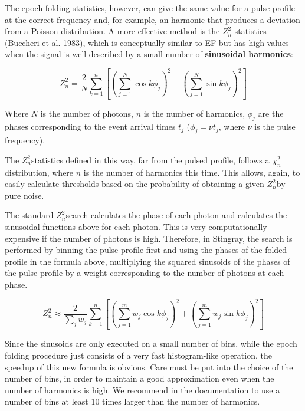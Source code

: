 \documentclass[12pt]{emulateapj}
\newcommand{\zsq}{\ensuremath{Z^2_n}}
\begin{document}
The epoch folding statistics, however, can give the same value for a pulse profile at the correct frequency and, for example, an harmonic that produces a deviation from a Poisson distribution.
A more effective method is the $Z^2_n$ statistics (Buccheri et al. 1983), which is conceptually similar to EF but has high values when the signal is well described by a small number of \textbf{sinusoidal harmonics}: 

\begin{equation}
\zsq = \dfrac{2}{N} \sum_{k=1}^n \left[{\left(\sum_{j=1}^N \cos k \phi_j\right)}^2 + {\left(\sum_{j=1}^N \sin k \phi_j\right)}^2\right]
\end{equation}

Where $N$ is the number of photons, $n$ is the number of harmonics, $\phi_j$ are the phases corresponding to the event arrival times $t_j$ ($\phi_j = \nu t_j$, where $\nu$ is the pulse frequency).

The \zsq statistics defined in this way, far from the pulsed profile, follows a $\chi^2_n$ distribution, where $n$ is the number of harmonics this time.
This allows, again, to easily calculate thresholds based on the probability of obtaining a given \zsq by pure noise.

The standard \zsq search calculates the phase of each photon and calculates the sinusoidal functions above for each photon.
This is very computationally expensive if the number of photons is high. 
Therefore, in Stingray, the search is performed by binning the pulse profile first and using the phases of the folded profile in the formula above, multiplying the squared sinusoids of the phases of the pulse profile by a weight corresponding to the number of photons at each phase.

\begin{equation}
\zsq \approx \dfrac{2}{\sum_j{w_j}} \sum_{k=1}^n \left[{\left(\sum_{j=1}^m w_j \cos k \phi_j\right)}^2 + {\left(\sum_{j=1}^m w_j \sin k \phi_j\right)}^2\right]
\end{equation}

Since the sinusoids are only executed on a small number of bins, while the epoch folding procedure just consists of a very fast histogram-like operation, the speedup of this new formula is obvious. 
Care must be put into the choice of the number of bins, in order to maintain a good approximation even when the number of harmonics is high. 
We recommend in the documentation to use a number of bins at least 10 times larger than the number of harmonics.
\end{document}
